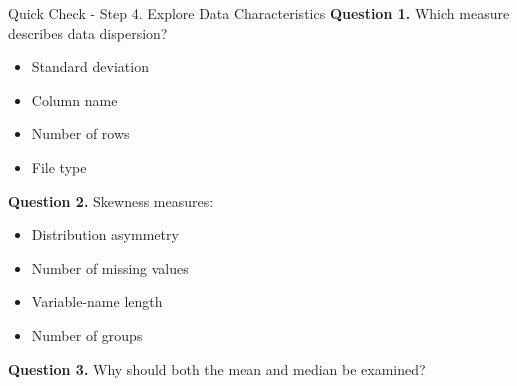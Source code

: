 \documentclass[aspectratio=169,11pt]{beamer}
\begin{document}
\begin{frame}[allowframebreaks]{Quick Check - Step 4. Explore Data Characteristics}
\footnotesize
\textbf{Question 1.} Which measure describes data dispersion?\par\medskip
\begin{itemize}
\item[\textbf{A.}] Standard deviation
\item[\textbf{B.}] Column name
\item[\textbf{C.}] Number of rows
\item[\textbf{D.}] File type
\end{itemize}
\textbf{Question 2.} Skewness measures:\par\medskip
\begin{itemize}
\item[\textbf{A.}] Distribution asymmetry
\item[\textbf{B.}] Number of missing values
\item[\textbf{C.}] Variable-name length
\item[\textbf{D.}] Number of groups
\end{itemize}
\textbf{Question 3.} Why should both the mean and median be examined?\par\medskip
\end{frame}
\end{document}
